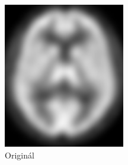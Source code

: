     \vfill
    \newpage
    \begin{figure}[htp]
        \center
        \begin{minipage}[c]{0.5\textwidth}
            \center
            \includegraphics[width = 150pt]{src/8Appendix/final/original.png}
            \caption{Originál}
        \end{minipage}
     \end{figure}
